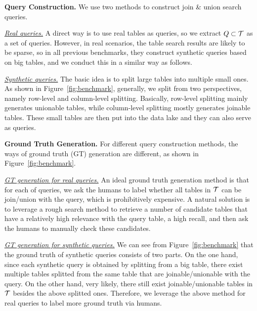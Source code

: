 


\noindent\textbf{Query Construction.} We use two methods to construct join \& union search queries.

\noindent \underline{\textit{Real queries.}}  A direct way  is to use real tables  as queries, so we  extract  $Q\subset \mathcal{T}$ as a set of queries. However, in real scenarios, the table search results are likely to be sparse, so in all previous benchmarks, they construct synthetic queries based on big tables, and we conduct this in a similar way as follows.

\noindent \underline{\textit{Synthetic queries.}} The basic idea is to split large tables into multiple small ones. As shown in Figure~\ref{fig:benchmark}, generally, we split from two perspectives, namely row-level and column-level splitting. 
Basically, row-level splitting mainly generates unionable tables, while column-level splitting mostly generates joinable tables.
These small tables are then put into the data lake and they can also serve as queries.


\noindent\textbf{Ground Truth Generation.} For different query construction methods, the ways of ground truth (GT) generation are different, as shown in Figure~\ref{fig:benchmark}.

 \noindent \underline{\textit{GT generation for real queries.}} An ideal ground truth generation method is that for each of queries, we ask the humans to label whether all tables in $\mathcal{T}$ can be join/union with the query, which is prohibitively expensive. A natural solution is to leverage a rough search  method to retrieve a number of candidate tables that have a relatively high relevance with the query table, \ie a high recall, and then ask the humans to manually check these candidates.
 
 \noindent \underline{\textit{GT generation for synthetic queries.}} We can see from  Figure~\ref{fig:benchmark} that the ground truth of synthetic queries consists of two parts. 
 On the one hand, since each synthetic query is obtained by splitting from a big table, there exist multiple tables splitted from the same table that are joinable/unionable with the query. 
  On the other hand, very likely, there  still exist joinable/unionable tables in $\mathcal{T}$ besides the above  splitted ones.  Therefore, we leverage the above method for  real queries to label more ground truth via humans.




